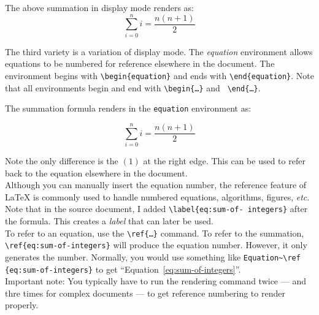 \documentclass{article}
\begin{document}
  The above summation in display mode renders as:
  \[
    \sum_{i=0}^n i=\frac{n(n+1)}{2}
  \]
  \vskip6pt

  The third variety is a variation of display mode. The \emph{equation}
  environment allows equations to be numbered for reference elsewhere in the
  document. The environment begins with {\tt \textbackslash begin\{equation\}}
  and ends with {\tt \textbackslash end\{equation\}}. Note that all environments
  begin and end with {\tt \textbackslash begin\{\ldots\}} and {\tt
  \textbackslash end\{\ldots\}}.

  The summation formula renders in the {\tt equation} environment as:

  \begin{equation}
    \sum_{i=0}^n i=\frac{n(n+1)}{2}\label{eq:sum-of-integers}
\end{equation}

Note the only difference is the $(1)$ at the right edge. This can be used to
refer back to the equation elsewhere in the document.\\

Although you can manually insert the equation number, the reference feature of
\LaTeX{} is commonly used to handle numbered equations, algorithms, figures,
\emph{etc}.
Note that in the source document, I added {\tt \textbackslash label\{eq:sum-of-%
integers\}} after the formula. This creates a \emph{label} that can later be
used.\\

To refer to an equation, use the {\tt \textbackslash ref\{\ldots\}} command.
To refer to the summation, {\tt \textbackslash ref\{eq:sum-of-integers\}} will
produce the equation number. However, it only generates the number. Normally,
you would use something like {\tt Equation\textasciitilde \textbackslash ref%
\{eq:sum-of-integers\}} to get ``Equation~\ref{eq:sum-of-integers}''.\\

Important note: You typically have to run the rendering command twice --- and
thre times for complex documents --- to get reference numbering to render
properly.
\end{document}
